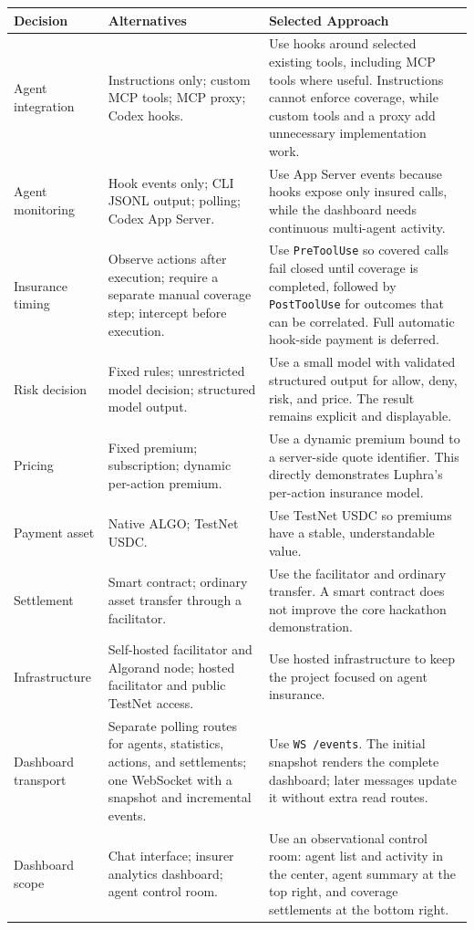 \documentclass[11pt]{article}
\begin{document}
\begin{tabularx}{\textwidth}{@{}p{}p{}X@{}}
\toprule
\textbf{Decision} & \textbf{Alternatives} & \textbf{Selected Approach} \\
\midrule
Agent integration &
Instructions only; custom MCP tools; MCP proxy; Codex hooks. &
Use hooks around selected existing tools, including MCP tools where useful.
Instructions cannot enforce coverage, while custom tools and a proxy add
unnecessary implementation work. \\

Agent monitoring &
Hook events only; CLI JSONL output; polling; Codex App Server. &
Use App Server events because hooks expose only insured calls, while the
dashboard needs continuous multi-agent activity. \\

Insurance timing &
Observe actions after execution; require a separate manual coverage step;
intercept before execution. &
Use \texttt{PreToolUse} so covered calls fail closed until coverage is completed,
followed by \texttt{PostToolUse} for outcomes that can be correlated. Full
automatic hook-side payment is deferred. \\

Risk decision &
Fixed rules; unrestricted model decision; structured model output. &
Use a small model with validated structured output for allow, deny, risk, and
price. The result remains explicit and displayable. \\

Pricing &
Fixed premium; subscription; dynamic per-action premium. &
Use a dynamic premium bound to a server-side quote identifier. This directly
demonstrates Luphra's per-action insurance model. \\

Payment asset &
Native ALGO; TestNet USDC. &
Use TestNet USDC so premiums have a stable, understandable value. \\

Settlement &
Smart contract; ordinary asset transfer through a facilitator. &
Use the facilitator and ordinary transfer. A smart contract does not improve
the core hackathon demonstration. \\

Infrastructure &
Self-hosted facilitator and Algorand node; hosted facilitator and public
TestNet access. &
Use hosted infrastructure to keep the project focused on agent insurance. \\

Dashboard transport &
Separate polling routes for agents, statistics, actions, and settlements; one
WebSocket with a snapshot and incremental events. &
Use \texttt{WS /events}. The initial snapshot renders the complete dashboard;
later messages update it without extra read routes. \\

Dashboard scope &
Chat interface; insurer analytics dashboard; agent control room. &
Use an observational control room: agent list and activity in the center,
agent summary at the top right, and coverage settlements at the bottom right. \\
\bottomrule
\end{tabularx}
\end{document}
